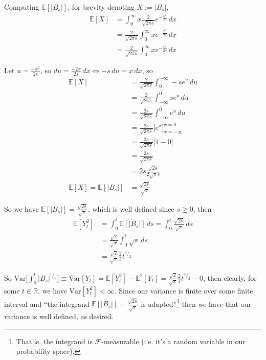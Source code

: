 \documentclass[12pt]{article}
\newlength\tindent
\renewcommand{\indent}{\hspace*{\tindent}}
\begin{document}
Computing $\mathbb E[|B_s|]$, for brevity denoting $X := |B_s|$,
\begin{align*}
	\mathbb E[X] &= \int^\infty_0 x\frac{2}{\sqrt{2\pi s}} e^{-\frac{x^2}{2s}}\,dx \\
	&= \frac{2}{\sqrt{2\pi s}}\int^\infty_0 xe^{-\frac{x^2}{2s}}\,dx \\
	&= \frac{2}{\sqrt{2\pi s}}\int^\infty_0 xe^{-\frac{x^2}{2s}}\,dx 
\end{align*}

Let $u = \frac{-x^2}{2s}$, so $du = \frac{-2x}{2s}\,dx \iff -s\,du = x\,dx$, so
\begin{align*}
	\mathbb E[X] &= \frac{2}{\sqrt{2\pi s}}\int^{-\infty}_0 -se^{u}\,du \\
	&= \frac{2}{\sqrt{2\pi s}}\int^0_{-\infty} se^{u}\,du  \\
	&= \frac{2s}{\sqrt{2\pi s}}\int^0_{-\infty} e^{u}\,du  \\
	&= \frac{2s}{\sqrt{2\pi s}}\big[e^x\big]^{x = 0}_{x = -\infty} \\
	&= \frac{2s}{\sqrt{2\pi s}}\big[1 - 0\big] \\
	&= \frac{2s}{\sqrt{2\pi s}} \\
	&= 2s\frac{\sqrt{2s}}{2\sqrt{\pi} s} \\
	\mathbb E[X] = \mathbb E[|B_s|] &= \frac{\sqrt{2s}}{\sqrt{\pi}}
\end{align*}

So we have $\mathbb E[|B_s|] = \frac{\sqrt{2s}}{\sqrt{\pi}}$, which is well defined since $s \geq 0$, then
\begin{align*}
	\mathbb E[Y_t^2] &= \int^t_0 \mathbb E[|B_s|]\,ds = \int^t_0 \frac{\sqrt{2s}}{\sqrt{\pi}}\,ds \\
	&= \frac{\sqrt{2}}{\sqrt{\pi}}\int^t_0\sqrt{s}\,ds \\
	&= \frac{\sqrt{2}}{\sqrt{\pi}}\frac{2}{3}t^{^3/_2}
\end{align*}

\indent So $\mathrm{Var}\Big[\int^t_0|B_s|^{^1/_2}\Big] \equiv \mathrm{Var}[Y_t] = \mathbb E[Y_t^2] - \mathbb E^2[Y_t] =  \frac{\sqrt{2}}{\sqrt{\pi}}\frac{2}{3}t^{^3/_2} - 0$, then clearly, for some $t \in \mathbb R$, we have $\mathrm{Var}[Y_t^2] < \infty$. Since our variance is finite over some finite interval and ``the integrand $\mathbb E[|B_s|] = \frac{\sqrt{2s}}{\sqrt{\pi}}$ is adapted''\footnote{That is, the integrand is $\mathcal F$-measurable (i.e. it's a random variable in our probability space).} then we have that our variance is well defined, as desired.
\end{document}
